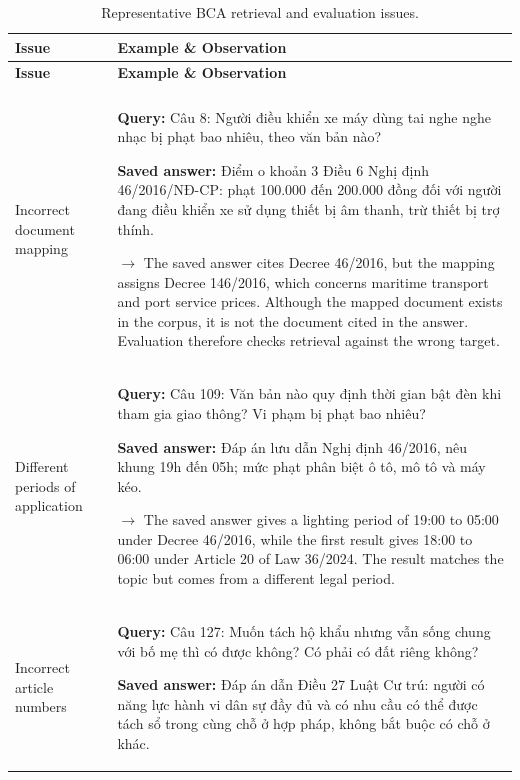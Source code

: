 \begingroup
\small
\setlength{\tabcolsep}{6pt}
\renewcommand{\arraystretch}{1.12}
\begin{longtable}{@{}>{\raggedright\arraybackslash}p{3cm}>{\raggedright\arraybackslash}p{12.25cm}@{}}
\caption{Representative BCA retrieval and evaluation issues.}\label{tab:legal-retrieval-cases}\\
\toprule
\textbf{Issue} & \textbf{Example \& Observation}\\
\midrule
\endfirsthead
\toprule
\textbf{Issue} & \textbf{Example \& Observation}\\
\midrule
\endhead
\midrule
\multicolumn{2}{r}{\footnotesize Continued on next page}\\
\endfoot
\bottomrule
\endlastfoot
Incorrect document mapping &
\textbf{Query:} Câu 8: Người điều khiển xe máy dùng tai nghe nghe nhạc bị phạt bao nhiêu, theo văn bản nào?\par\smallskip
\textbf{Saved answer:} Điểm o khoản 3 Điều 6 Nghị định 46/2016/NĐ-CP: phạt 100.000 đến 200.000 đồng đối với người đang điều khiển xe sử dụng thiết bị âm thanh, trừ thiết bị trợ thính.\par\smallskip
\(\rightarrow\) The saved answer cites Decree 46/2016, but the mapping assigns Decree 146/2016, which concerns maritime transport and port service prices. Although the mapped document exists in the corpus, it is not the document cited in the answer. Evaluation therefore checks retrieval against the wrong target.\\
\midrule
Different periods of application &
\textbf{Query:} Câu 109: Văn bản nào quy định thời gian bật đèn khi tham gia giao thông? Vi phạm bị phạt bao nhiêu?\par\smallskip
\textbf{Saved answer:} Đáp án lưu dẫn Nghị định 46/2016, nêu khung 19h đến 05h; mức phạt phân biệt ô tô, mô tô và máy kéo.\par\smallskip
\(\rightarrow\) The saved answer gives a lighting period of 19:00 to 05:00 under Decree 46/2016, while the first result gives 18:00 to 06:00 under Article 20 of Law 36/2024. The result matches the topic but comes from a different legal period.\\
\midrule
Incorrect article numbers &
\textbf{Query:} Câu 127: Muốn tách hộ khẩu nhưng vẫn sống chung với bố mẹ thì có được không? Có phải có đất riêng không?\par\smallskip
\textbf{Saved answer:} Đáp án dẫn Điều 27 Luật Cư trú: người có năng lực hành vi dân sự đầy đủ và có nhu cầu có thể được tách sổ trong cùng chỗ ở hợp pháp, không bắt buộc có chỗ ở khác.\par\smallskip

\end{longtable}
